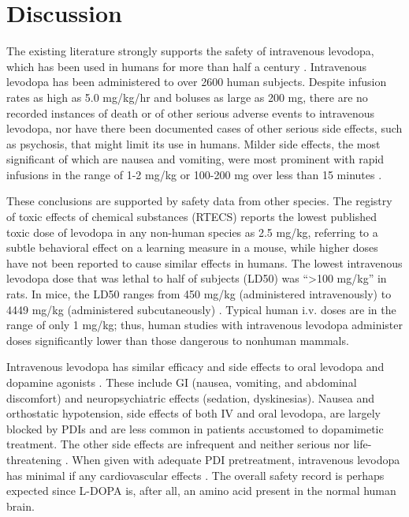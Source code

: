 \section{Discussion}
The existing literature strongly supports the safety of intravenous levodopa, which has been used in humans for more than half a century \cite{14430381}.  Intravenous levodopa has been administered to over 2600 human subjects.  Despite infusion rates as high as 5.0 mg/kg/hr and boluses as large as 200 mg, there are no recorded instances of death or of other serious adverse events to intravenous levodopa, nor have there been documented cases of other serious side effects, such as psychosis, that might limit its use in humans. Milder side effects, the most significant of which are nausea and vomiting, were most prominent with rapid infusions in the range of 1-2 mg/kg or 100-200 mg over less than 15 minutes \cite{5327616,Bbrung_1966,12865145,4555619,6540399,4880674}. 

These conclusions are supported by safety data from other species. The registry of toxic effects of chemical substances (RTECS) reports the lowest published toxic dose of levodopa in any non-human species as 2.5 mg/kg, referring to a subtle behavioral effect on a learning measure in a mouse, while higher doses have not been reported to cause similar effects in humans.  The lowest intravenous levodopa dose that was lethal to half of subjects (LD50) was ``>100 mg/kg'' in rats.  In mice, the LD50 ranges from 450 mg/kg (administered intravenously) to 4449 mg/kg (administered subcutaneously) \cite{rtecs}.  Typical human i.v. doses are in the range of only 1 mg/kg; thus, human studies with intravenous levodopa administer doses significantly lower than those dangerous to nonhuman mammals. 

Intravenous levodopa has similar efficacy and side effects to oral levodopa \cite{Connolly_2014} and dopamine agonists \cite{Bonuccelli_2008}.  These include GI (nausea, vomiting, and abdominal discomfort) and neuropsychiatric effects (sedation, dyskinesias).  Nausea and orthostatic hypotension, side effects of both IV and oral levodopa, are largely blocked by PDIs and are less common in patients accustomed to dopamimetic treatment.  The other side effects are infrequent and neither serious nor life-threatening \cite{Connolly_2014}. When given with adequate PDI pretreatment, intravenous levodopa has minimal if any cardiovascular effects \cite{Siddiqi2015}. The overall safety record is perhaps expected since L-DOPA is, after all, an amino acid present in the normal human brain. 

